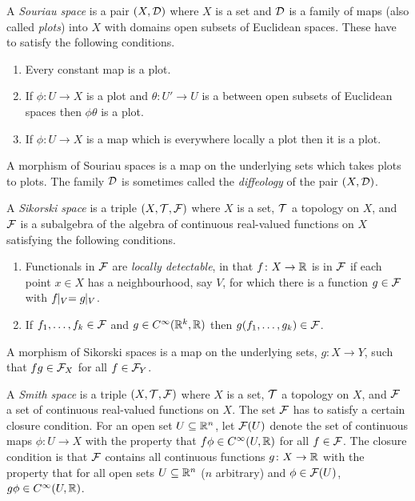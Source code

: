 \documentclass[%
12pt,%
arxiv,%
defaults
]{myclass}
\begin{document}
\begin{defn}
 A \emph{Souriau space} is a pair \((X, \mathcal{D})\) where \(X\) is a set and \(\mathcal{D}\) is a family of maps (also called \emph{plots}) into \(X\) with domains open subsets of Euclidean spaces.
 These have to satisfy the following conditions.
 \begin{enumerate}
 \item
  Every constant map is a plot.
 \item
  If \(\phi \colon U \to X\) is a plot and
   \(\theta \colon U' \to U\)
  is a \cimap between open subsets of Euclidean spaces then \(\phi\theta\) is a plot.
 \item
  If \(\phi \colon U \to X\) is a map which is everywhere locally a plot then it is a plot.
 \end{enumerate}

 A morphism of Souriau spaces is a map on the underlying sets which takes plots to plots.
 The family \(\mathcal{D}\) is sometimes called the \emph{diffeology} of the pair \((X, \mathcal{D})\).
\end{defn}

\begin{defn}
 A \emph{Sikorski space} is a triple \((X, \mathcal{T}, \mathcal{F})\) where \(X\) is a set, \(\mathcal{T}\) a topology on \(X\), and \(\mathcal{F}\) is a subalgebra of the algebra of continuous real\hyp{}valued functions on \(X\) satisfying the following conditions.
 \begin{enumerate}
 \item
  Functionals in \(\mathcal{F}\) are \emph{locally detectable}, in that \(f \colon X \to \mathbb{R}\) is in \(\mathcal{F}\) if each point \(x \in X\) has a neighbourhood, say \(V\), for which there is a function \(g \in \mathcal{F}\) with
   \(f \!\!\mid_V = g \!\!\mid_V\).

 \item
  If
   \(f_1, \dotsc, f_k \in \mathcal{F}\)
  and \(g \in C^\infty(\mathbb{R}^k, \mathbb{R})\) then
   \(g(f_1, \dotsc, g_k) \in \mathcal{F}\).
 \end{enumerate}

 A morphism of Sikorski spaces is a map on the underlying sets, \(g \colon X \to Y\), such that \(f g \in \mathcal{F}_X\) for all \(f \in \mathcal{F}_Y\).
\end{defn}

\begin{defn}
A \emph{Smith space} is a triple \((X, \mathcal{T}, \mathcal{F})\) where \(X\) is a set, \(\mathcal{T}\) a topology on \(X\), and \(\mathcal{F}\) a set of continuous real\hyp{}valued functions on \(X\).
The set \(\mathcal{F}\) has to satisfy a certain closure condition.
For an open set \(U \subseteq \mathbb{R}^n\), let \(\mathcal{F}(U)\) denote the set of continuous maps \(\phi \colon U \to X\) with the property that \(f \phi \in C^\infty(U, \mathbb{R})\) for all \(f \in \mathcal{F}\).
The closure condition is that \(\mathcal{F}\) contains all continuous functions \(g \colon X \to \mathbb{R}\) with the property that for all open sets \(U \subseteq \mathbb{R}^n\) (\(n\) arbitrary) and \(\phi \in \mathcal{F}(U)\), \(g \phi \in C^\infty(U, \mathbb{R})\).
\end{defn}
\end{document}
